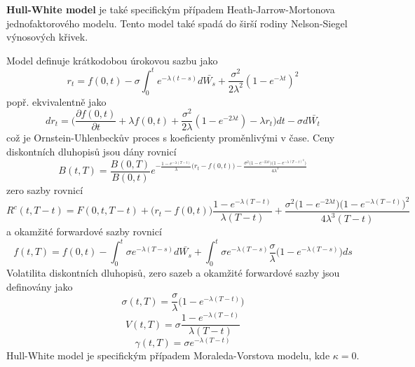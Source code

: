 \documentclass[a4paper]{book}
\begin{document}
\noindent \textbf{Hull-White model} je také specifickým případem Heath-Jarrow-Mortonova jednofaktorového modelu. Tento model také spadá do širší rodiny Nelson-Siegel výnosových křivek.

Model definuje krátkodobou úrokovou sazbu jako
\begin{equation*}
r_t = f(0,t) - \sigma \int_0^t e^{-\lambda (t-s)}d\bar{W_s} + \frac{\sigma^2}{2 \lambda^2} (1 - e^{-\lambda t})^2
\end{equation*}
popř. ekvivalentně jako
\begin{equation*}
d r_t = \Big( \frac{\partial f(0,t)}{\partial t} + \lambda f(0,t) + \frac{\sigma^2}{2 \lambda}(1 - e^{-2\lambda t}) - \lambda r_t \Big) dt - \sigma d \bar{W_t}
\end{equation*}
což je Ornstein-Uhlenbeckův proces s koeficienty proměnlivými v čase. Ceny diskontních dluhopisů jsou dány rovnicí
\begin{equation*}
B(t,T) = \frac{B(0,T)}{B(0,t)} e^{-\frac{1-e^{-\lambda(T-t)}}{\lambda}\big( r_t - f(0,t) \big) - \frac{\sigma^2 \big(1 - e^{-2 \lambda t}\big)\big( 1 - e^{-\lambda(T-t)^2}\big)}{4 \lambda^3}}
\end{equation*}
zero sazby rovnicí
\begin{equation*}
R^c(t,T-t) = F(0,t,T-t) + \big(r_t - f(0,t)\big)\frac{1 - e^{-\lambda(T-t)}}{\lambda(T-t)} + \frac{\sigma^2 \big(1 - e^{-2 \lambda t} \big)\big( 1 - e^{-\lambda(T-t)}\big)^2}{4 \lambda^3(T-t)}
\end{equation*}
a okamžité forwardové sazby rovnicí
\begin{equation*}
f(t,T) = f(0,t) - \int_0^t \sigma e^{-\lambda(T-s)}d\bar{W_s} + \int_0^t \sigma e^{-\lambda(T-s)}\frac{\sigma}{\lambda}\big(1 - e^{-\lambda(T-s)}\big) ds
\end{equation*}
Volatilita diskontních dluhopisů, zero sazeb a okamžité forwardové sazby jsou definovány jako
\begin{equation*}
\sigma(t,T) = \frac{\sigma}{\lambda}\big( 1 - e^{-\lambda(T-t)}\big)
\end{equation*}
\begin{equation*}
V(t,T) = \sigma \frac{1 - e^{-\lambda(T-t)}}{\lambda(T-t)}
\end{equation*}
\begin{equation*}
\gamma(t,T) = \sigma e^{-\lambda(T-t)}
\end{equation*}
Hull-White model je specifickým případem Moraleda-Vorstova modelu, kde $\kappa = 0$.\\
\end{document}
